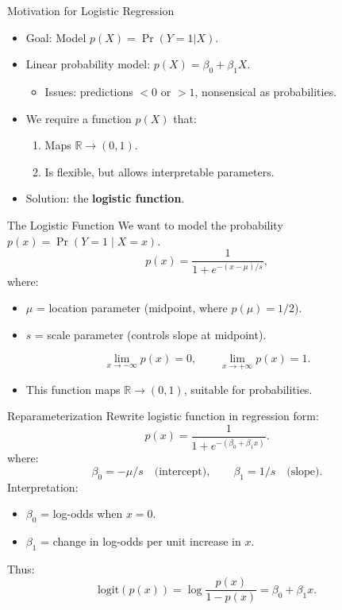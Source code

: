 \documentclass[../../main.tex]{subfiles}
\begin{document}
\begin{frame}{Motivation for Logistic Regression}
\begin{itemize}
    \item Goal: Model $p(X) = \Pr(Y=1|X)$.  
    \item Linear probability model: $p(X) = \beta_0 + \beta_1 X$.
    \begin{itemize}
        \item Issues: predictions $<0$ or $>1$, nonsensical as probabilities.  
    \end{itemize}
    \item We require a function $p(X)$ that:
    \begin{enumerate}
        \item Maps $\mathbb{R} \to (0,1)$.  
        \item Is flexible, but allows interpretable parameters.  
    \end{enumerate}
    \item Solution: the \textbf{logistic function}.
\end{itemize}
\end{frame}

\begin{frame}{The Logistic Function}
We want to model the probability $p(x) = \Pr(Y=1 \mid X=x)$.  
\[
p(x) = \frac{1}{1 + e^{-(x-\mu)/s}},
\]
where:
\begin{itemize}
    \item $\mu$ = location parameter (midpoint, where $p(\mu)=1/2$).  
    \item $s$ = scale parameter (controls slope at midpoint).  
\end{itemize}
\[
\lim_{x\to -\infty} p(x) = 0, \qquad \lim_{x\to +\infty} p(x) = 1.
\]
\begin{itemize}
    \item This function maps $\mathbb{R} \to (0,1)$, suitable for probabilities.  
\end{itemize}
\end{frame}

\begin{frame}{Reparameterization}
Rewrite logistic function in regression form:
\[
p(x) = \frac{1}{1 + e^{-(\beta_0 + \beta_1 x)}}.
\]
where:
\[
\beta_0 = -\mu/s \quad \text{(intercept)}, \qquad \beta_1 = 1/s \quad \text{(slope)}.
\]
Interpretation:
\begin{itemize}
    \item $\beta_0$ = log-odds when $x=0$.  
    \item $\beta_1$ = change in log-odds per unit increase in $x$.  
\end{itemize}
Thus:
\[
\text{logit}(p(x)) = \log \frac{p(x)}{1-p(x)} = \beta_0 + \beta_1 x.
\]
\end{frame}
\end{document}
